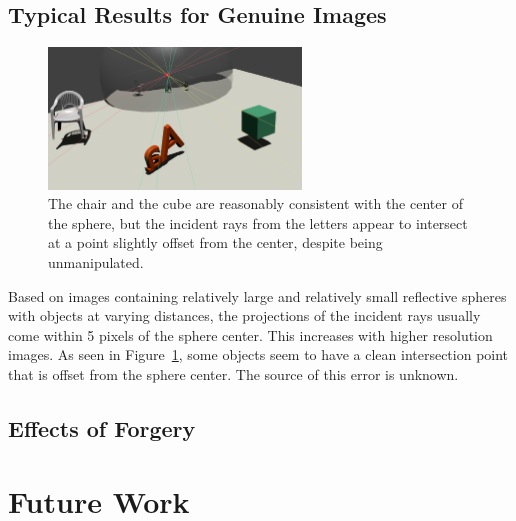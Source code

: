 \documentclass{thesis}
\begin{document}

\section{Typical Results for Genuine Images}
\begin{figure}
	\centering
    	\includegraphics[width=0.6\textwidth]{1b-genuine}
	\caption{The chair and the cube are reasonably consistent with the center of the sphere, but the incident rays from the letters appear to intersect at a point slightly offset from the center, despite being unmanipulated.}
	\label{1b-genuine}
\end{figure}
Based on images containing relatively large and relatively small reflective spheres with objects at varying distances, the projections of the incident rays usually come within 5 pixels of the sphere center. This increases with higher resolution images. As seen in Figure~\ref{1b-genuine}, some objects seem to have a clean intersection point that is offset from the sphere center. The source of this error is unknown.



\section{Effects of Forgery}



\chapter{Future Work}


\clearpage

\appendix
%


\end{document}

